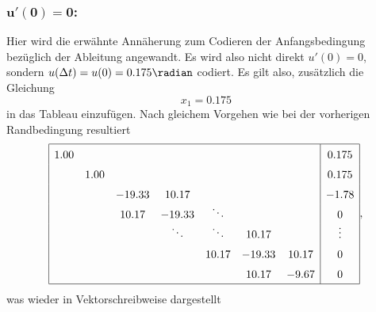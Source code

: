 \subsubsection{$\mathbf{u'(0) = 0 }$:}
Hier wird die erwähnte Annäherung zum Codieren der Anfangsbedingung bezüglich der Ableitung angewandt.
Es wird also nicht direkt $u'(0) = 0 $, sondern $u(\Delta t) = u(0) = 0.175 \radian$ codiert.
Es gilt also, zusätzlich die Gleichung
\begin{equation}
    x_1 = 0.175
\end{equation}
in das Tableau einzufügen.
Nach gleichem Vorgehen wie bei der vorherigen Randbedingung resultiert
\begin{equation}
    \def\arraystretch{1.5}
    \begin{array}{|ccccccc|c|}
        \hline
         1.00  &        &        &                &                &        &        & 0.175          \\
               &  1.00  &        &                &                &        &        & 0.175          \\
               &        &-19.33  & 10.17          &                &        &        & -1.78          \\
               &        & 10.17  &-19.33          & \smash{\ddots} &        &        & 0              \\
               &        &        & \smash{\ddots} & \smash{\ddots} & 10.17  &        & \smash{\vdots} \\
               &        &        &                & 10.17          &-19.33  & 10.17  & 0              \\
               &        &        &                &                & 10.17  & -9.67  & 0              \\
        \hline
    \end{array},
\end{equation}
was wieder in Vektorschreibweise dargestellt
